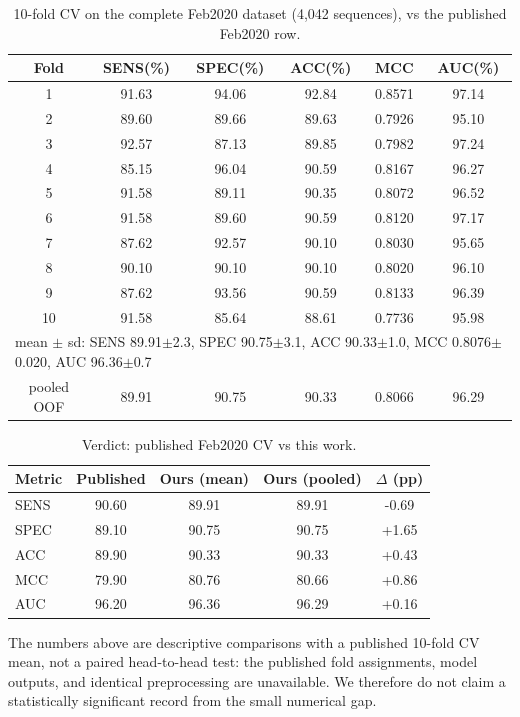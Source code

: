 \begin{table}[h]\centering\small
\caption{10-fold CV on the complete Feb2020 dataset (4{,}042 sequences), vs
the published Feb2020 row.}
\label{tab:feb2020}
\begin{tabular}{cccccc}
\hline
Fold & SENS(\%) & SPEC(\%) & ACC(\%) & MCC & AUC(\%) \\
\hline
1 & 91.63 & 94.06 & 92.84 & 0.8571 & 97.14 \\
2 & 89.60 & 89.66 & 89.63 & 0.7926 & 95.10 \\
3 & 92.57 & 87.13 & 89.85 & 0.7982 & 97.24 \\
4 & 85.15 & 96.04 & 90.59 & 0.8167 & 96.27 \\
5 & 91.58 & 89.11 & 90.35 & 0.8072 & 96.52 \\
6 & 91.58 & 89.60 & 90.59 & 0.8120 & 97.17 \\
7 & 87.62 & 92.57 & 90.10 & 0.8030 & 95.65 \\
8 & 90.10 & 90.10 & 90.10 & 0.8020 & 96.10 \\
9 & 87.62 & 93.56 & 90.59 & 0.8133 & 96.39 \\
10 & 91.58 & 85.64 & 88.61 & 0.7736 & 95.98 \\
\hline
\multicolumn{6}{l}{mean $\pm$ sd: SENS 89.91$\pm$2.3, SPEC 90.75$\pm$3.1, ACC 90.33$\pm$1.0, MCC 0.8076$\pm$0.020, AUC 96.36$\pm$0.7} \\
pooled OOF & 89.91 & 90.75 & 90.33 & 0.8066 & 96.29 \\
\hline
\end{tabular}
\end{table}

\begin{table}[h]\centering\small
\caption{Verdict: published Feb2020 CV vs this work.}
\label{tab:feb2020-verdict}
\begin{tabular}{lcccc}
\hline
Metric & Published & Ours (mean) & Ours (pooled) & $\Delta$ (pp) \\
\hline
SENS & 90.60 & 89.91 & 89.91 & -0.69 \\
SPEC & 89.10 & 90.75 & 90.75 & +1.65 \\
ACC & 89.90 & 90.33 & 90.33 & +0.43 \\
MCC & 79.90 & 80.76 & 80.66 & +0.86 \\
AUC & 96.20 & 96.36 & 96.29 & +0.16 \\
\hline
\end{tabular}
\end{table}

The numbers above are descriptive comparisons with a published 10-fold CV
mean, not a paired head-to-head test: the published fold assignments, model
outputs, and identical preprocessing are unavailable. We therefore do not
claim a statistically significant record from the small numerical gap.

